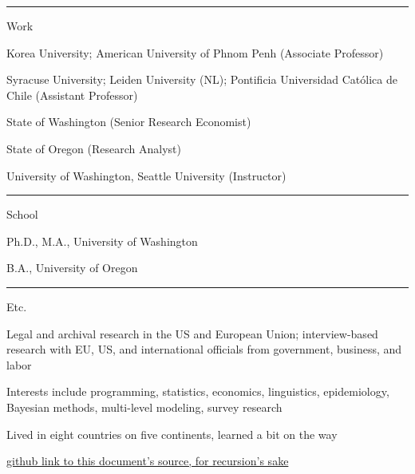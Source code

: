 \documentclass[letterpaper, english, 11pt]{article}
\newenvironment{packed_itemize}{
	\begin{itemize}
		\setlength{\itemsep}{1pt}
		\setlength{\parskip}{2pt}
		\setlength{\parsep}{2pt}
	} {\end{itemize}
}
\begin{document}
\vspace{6pt}
\hrule

Work

\begin{footnotesize}
	\begin{packed_itemize}
		\item Korea University; American University of Phnom Penh (Associate Professor)
		\item Syracuse University; Leiden University (NL); Pontificia Universidad Cat{\'o}lica de Chile (Assistant Professor)
		\item State of Washington (Senior Research Economist)
		\item State of Oregon (Research Analyst)
		\item University of Washington, Seattle University (Instructor)
	\end{packed_itemize}
\end{footnotesize}

\vspace{6pt}
\hrule

School

\begin{footnotesize}
	\begin{packed_itemize}
		\item Ph.D., M.A., University of Washington
		\item B.A., University of Oregon
	\end{packed_itemize}
\end{footnotesize}

\vspace{6pt}
\hrule

Etc.

\begin{footnotesize}
	\begin{packed_itemize}
		\item Legal and archival research in the US and European Union; interview-based research with EU, US, and international officials from government, business, and labor 
		\item Interests include programming, statistics, economics, linguistics, epidemiology, Bayesian methods, multi-level modeling, survey research
		\item Lived in eight countries on five continents, learned a bit on the way
		\item \href{https://github.com/rsspdx/resume/blob/main/sherman-resume.tex}{github link to this document's source, for recursion's sake}
	\end{packed_itemize}
\end{footnotesize} 
\end{document}
